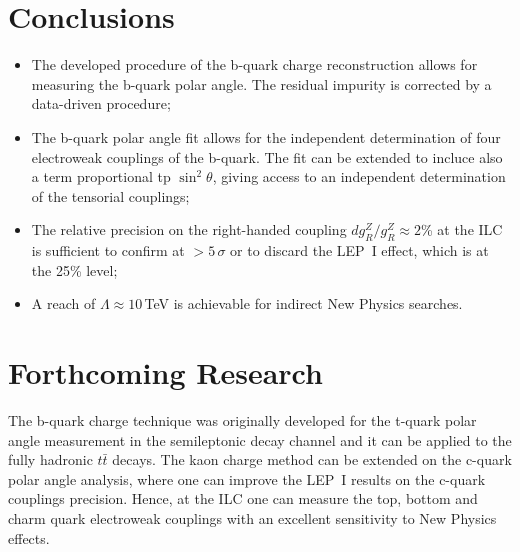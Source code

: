 
\color{Blue} %

\section*{Conclusions}

\begin{itemize}
\item The developed procedure of the b-quark charge reconstruction allows for measuring the b-quark polar angle. The residual impurity is corrected by a data-driven procedure;
\item The b-quark polar angle fit allows for the independent determination of four electroweak couplings of the b-quark. The fit can be extended to incluce also a term proportional tp $\sin^2\theta$, giving access to an independent determination of the tensorial couplings;
\item  The relative precision on the right-handed coupling $dg^Z_R/g^Z_R\approx 2$\% at the ILC is sufficient to confirm at $>5\,\sigma$ or to discard the LEP~I effect, which is at the 25\% level;
\item A reach of $\Lambda \approx 10$\,TeV is achievable for indirect New Physics searches.
\end{itemize}

\color{DarkGreen} %


\section*{Forthcoming Research}
The b-quark charge technique was originally developed for the t-quark polar angle measurement in the semileptonic decay channel and it can be applied to the fully hadronic $t\bar{t}$ decays.
The kaon charge method can be extended on the c-quark polar angle analysis, where one can improve the LEP~I results on the c-quark couplings precision. 
Hence, at the ILC one can measure the top, bottom and charm quark electroweak couplings with an excellent sensitivity to New Physics effects.

